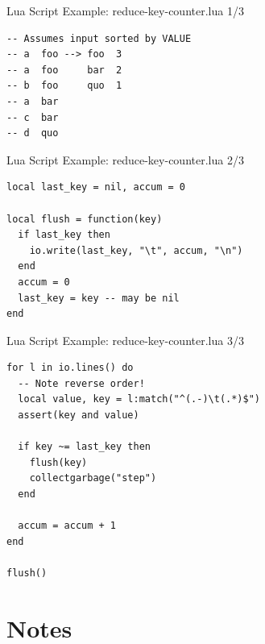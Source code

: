 \documentclass[handout]{beamer}
\begin{document}

\begin{frame}[fragile]{Lua Script Example: reduce-key-counter.lua 1/3}

\begin{verbatim}
-- Assumes input sorted by VALUE
-- a  foo --> foo  3
-- a  foo     bar  2
-- b  foo     quo  1
-- a  bar
-- c  bar
-- d  quo
\end{verbatim}

\end{frame}


\begin{frame}[fragile]{Lua Script Example: reduce-key-counter.lua 2/3}

\begin{verbatim}
local last_key = nil, accum = 0

local flush = function(key)
  if last_key then
    io.write(last_key, "\t", accum, "\n")
  end
  accum = 0
  last_key = key -- may be nil
end
\end{verbatim}

\end{frame}


\begin{frame}[fragile]{Lua Script Example: reduce-key-counter.lua 3/3}

\begin{verbatim}
for l in io.lines() do
  -- Note reverse order!
  local value, key = l:match("^(.-)\t(.*)$")
  assert(key and value)

  if key ~= last_key then
    flush(key)
    collectgarbage("step")
  end

  accum = accum + 1
end

flush()
\end{verbatim}

\end{frame}


\section{Notes}

\end{document}
